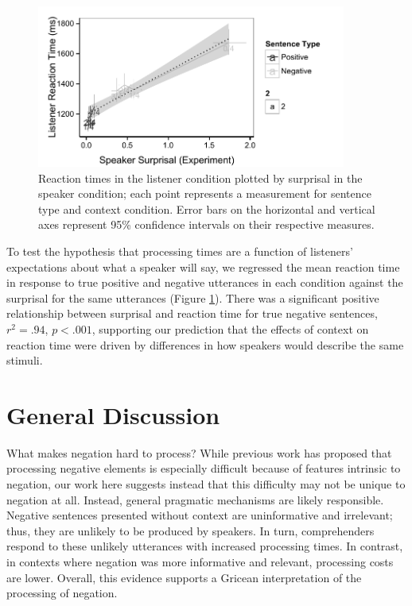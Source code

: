 \documentclass[man, noapacite]{apa2}
\begin{document}
\begin{figure}[t]
\begin{center} 
\includegraphics[width=4in]{figures/production_rts.pdf}
\caption{\label{fig:scatter} Reaction times in the listener condition plotted by surprisal in the speaker condition; each point represents a measurement for sentence type and context condition. Error bars on the horizontal and vertical axes represent 95\% confidence intervals on their respective measures.}
\end{center} 
\end{figure}

To test the hypothesis that processing times are a function of listeners' expectations about what a speaker will say, we regressed the mean reaction time in response to true positive and negative utterances in each condition against the surprisal for the same utterances (Figure \ref{fig:scatter}).  There was a significant positive relationship between surprisal and reaction time for true negative sentences, $r^2=.94$, $p<.001$, supporting our prediction that the effects of context on reaction time were driven by differences in how speakers would describe the same stimuli.  

\section{General Discussion}

What makes negation hard to process? While previous work has proposed that processing negative elements is especially difficult because of features intrinsic to negation, our work here suggests instead that this difficulty may not be unique to negation at all. Instead, general pragmatic mechanisms are likely responsible. Negative sentences presented without context are uninformative and irrelevant; thus, they are unlikely to be produced by speakers. In turn, comprehenders respond to these unlikely utterances with increased processing times. In contrast, in contexts where negation was more informative and relevant, processing costs are lower. Overall, this evidence supports a Gricean interpretation of the processing of negation.
\end{document}
